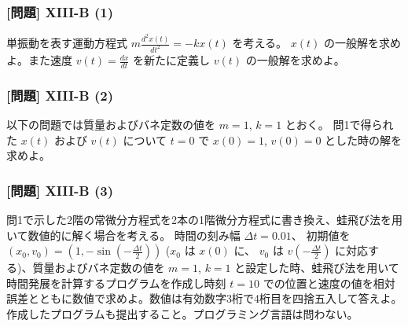 \documentclass[dvipdfmx,aspectratio=169,20pt]{beamer}
\newcommand{\myfontsetting}[3]{{\fontsize{#1}{#2}\selectfont #3}}
\begin{document}
\begin{frame}
\frametitle{[問題] X\hspace{-.1em}I\hspace{-.1em}I\hspace{-.1em}I-B (1)}
\myfontsetting{18pt}{18pt}{
単振動を表す運動方程式 $m\frac{d^2 x(t)}{dt^2}= - k x(t)$ を考える。
$x(t)$ の一般解を求めよ。また速度 $v(t)=\frac{dx}{dt}$ を新たに定義し $v(t)$ の一般解を求めよ。
}
\end{frame}
\begin{frame}
\frametitle{[問題] X\hspace{-.1em}I\hspace{-.1em}I\hspace{-.1em}I-B (2)}
\myfontsetting{18pt}{18pt}{
以下の問題では質量およびバネ定数の値を $m=1$, $k=1$ とおく。
問1で得られた $x(t)$ および $v(t)$ について $t=0$ で $x(0)=1$, $v(0)=0$ とした時の解を求めよ。
}
\end{frame}
\begin{frame}
\frametitle{[問題] X\hspace{-.1em}I\hspace{-.1em}I\hspace{-.1em}I-B (3)}
\myfontsetting{13pt}{15pt}{
問1で示した2階の常微分方程式を2本の1階微分方程式に書き換え、蛙飛び法を用いて数値的に解く場合を考える。
時間の刻み幅 $\varDelta t=0.01$、 初期値を $(x_0,v_0)=(1,- \sin \left(- \frac{\varDelta t}{2}\right) )$ ($x_0$ は $x(0)$ に、 $v_0$ は $v\left(- \frac{\varDelta t}{2}\right)$ に対応する)、質量およびバネ定数の値を $m=1$, $k=1$ と設定した時、蛙飛び法を用いて時間発展を計算するプログラムを作成し時刻 $t=10$ での位置と速度の値を相対誤差とともに数値で求めよ。数値は有効数字3桁で4桁目を四捨五入して答えよ。
}\\
\myfontsetting{12pt}{12pt}{
作成したプログラムも提出すること。プログラミング言語は問わない。
}
\end{frame}
\end{document}
